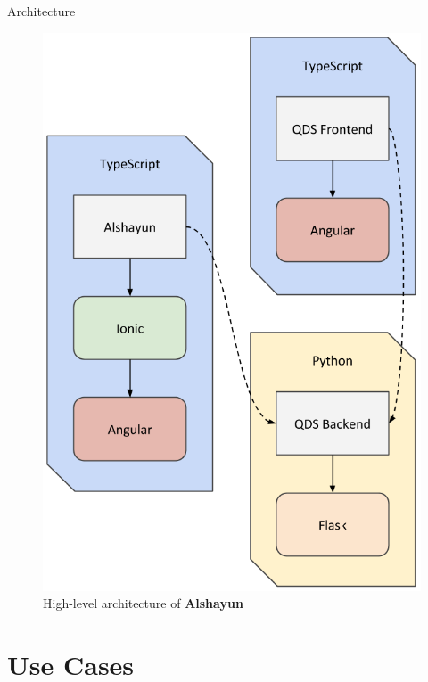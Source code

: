 \documentclass{beamer}
\begin{document}
\begin{frame}{Architecture}
    \begin{figure}
        \begin{center}
            \includegraphics[scale=0.2]{images/arch.png}
        \end{center}
        \caption{High-level architecture of \textbf{Alshayun}}
    \end{figure}
\end{frame}

\section{Use Cases}
\end{document}

